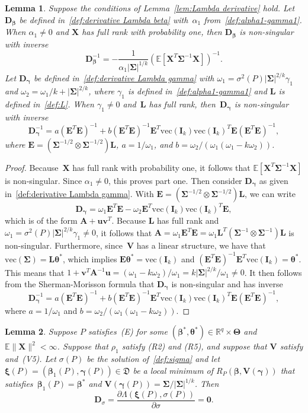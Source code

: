 \documentclass{article}
\numberwithin{equation}{section}
\theoremstyle{plain}
\newtheorem{lemma}{Lemma}
\newcommand{\R}{\mathbb{R}}
\newcommand{\vc}{\mathrm{vec}}
\newcommand{\bbeta}{\bm\beta}
\newcommand{\btheta}{\bm\theta}
\newcommand{\bxi}{\bm\xi}
\newcommand{\bgamma}{\bm\gamma}
\newcommand{\bSigma}{\mathbf{\Sigma}}
\newcommand{\bTheta}{\bm\Theta}
\newcommand{\bu}{\mathbf{u}}
\newcommand{\bv}{\mathbf{v}}
\newcommand{\bX}{\mathbf{X}}
\newcommand{\bV}{\mathbf{V}}
\newcommand{\bI}{\mathbf{I}}
\newcommand{\bA}{\mathbf{A}}
\newcommand{\bD}{\mathbf{D}}
\newcommand{\bL}{\mathbf{L}}
\newcommand{\bE}{\mathbf{E}}
\newcommand{\E}{\mathbb{E}}
\begin{document}
\begin{lemma}
\label{lem:inverse}
Suppose the conditions of Lemma~\ref{lem:Lambda derivative} hold.
Let $\bD_{\bbeta}$ be defined in~\eqref{def:derivative Lambda beta} with~$\alpha_1$ from~\eqref{def:alpha1-gamma1}.
When $\alpha_1\ne0$ and $\bX$ has full rank with probability one,
then $\bD_{\bbeta}$ is non-singular with inverse
\[
\bD_{\bbeta}^{-1}
=
-\frac{1}{\alpha_1|\bSigma|^{1/k}}
\left(
\E\left[
\bX^T\bSigma^{-1}\bX
\right]
\right)^{-1}.
\] 
Let $\bD_{\bgamma}$ be defined in~\eqref{def:derivative Lambda gamma}
with $\omega_1=\sigma^2(P)|\bSigma|^{2/k}\gamma_1$ and $\omega_2=\omega_1/k+|\bSigma|^{2/k}$, 
where $\gamma_1$ is defined in~\eqref{def:alpha1-gamma1} and $\bL$ is defined in~\eqref{def:L}.
When $\gamma_1\ne0$ and~$\bL$ has full rank,
then~$\bD_{\bgamma}$ is non-singular with inverse
\[
\bD_{\bgamma}^{-1}
=
a(\bE^T\bE)^{-1}
+
b
(\bE^T\bE)^{-1}
\bE^T\vc(\bI_k)\vc(\bI_k)^T\bE
(\bE^T\bE)^{-1},
\]
where $\bE=(\bSigma^{-1/2}\otimes\bSigma^{-1/2})\bL$,
$a=1/\omega_1$, and $b=\omega_2/(\omega_1(\omega_1-k\omega_2))$.
\end{lemma}
\begin{proof}
Because~$\bX$ has full rank with probability one, it follows that $\E[\bX^T\bSigma^{-1}\bX]$ is non-singular.
Since $\alpha_1\ne0$, this proves part one.
Then consider $\bD_{\bgamma}$ as given in~\eqref{def:derivative Lambda gamma}.
With $\bE=(\bSigma^{-1/2}\otimes\bSigma^{-1/2})\bL$,
we can write
\[
\bD_{\bgamma}
=
\omega_1\bE^T\bE
-
\omega_2\bE^T\vc(\bI_k)\vc(\bI_k)^T\bE,
\]
which is of the form $\bA+\bu\bv^T$.
Because $\bL$ has full rank and $\omega_1=\sigma^2(P)|\bSigma|^{2/k}\gamma_1\ne0$, it follows that 
$\bA=\omega_1\bE^T\bE=\omega_1\bL^T\left(\bSigma^{-1}\otimes\bSigma^{-1}\right)\bL$ is non-singular.
Furthermore, since~$\bV$ has a linear structure, we have that $\vc(\bSigma)=\bL\btheta^*$,
which implies $\bE\btheta^*=\vc(\bI_k)$ and $(\bE^T\bE)^{-1}\bE^T\vc(\bI_k)=\btheta^*$.
This means that $1+\bv^T\bA^{-1}\bu=(\omega_1-k\omega_2)/\omega_1=k|\bSigma|^{2/k}/\omega_1\ne0$.
It then follows from the Sherman-Morisson formula that $\bD_{\bgamma}$ is non-singular
and has inverse
\[
\bD_{\bgamma}^{-1}
=
a(\bE^T\bE)^{-1}
+
b
(\bE^T\bE)^{-1}
\bE^T\vc(\bI_k)\vc(\bI_k)^T\bE
(\bE^T\bE)^{-1},
\]
where 
$a=1/\omega_1$ and $b=\omega_2/(\omega_1(\omega_1-k\omega_2))$.
\end{proof}

\begin{lemma}
\label{lem:Dsigma=0}
Suppose $P$ satisfies~(E) for some $(\bbeta^*,\btheta^*)\in\R^q\times\bTheta$
and~$\E\|\bX\|^2<\infty$.
Suppose that $\rho_1$ satisfy (R2) and (R5), and suppose that $\bV$ satisfy and~(V5).
Let $\sigma(P)$ be the solution of~\eqref{def:sigma} and let $\bxi(P)=(\bbeta_1(P),\bgamma(P))\in \mathfrak{D}$ be
a local minimum of $R_P(\bbeta,\bV(\bgamma))$ that
satisfies~$\bbeta_1(P)=\bbeta^*$ and $\bV(\bgamma(P))=\bSigma/|\bSigma|^{1/k}$.
Then 
\[
\bD_{\sigma}
=
\frac{\partial\Lambda(\bxi(P),\sigma(P))}{\partial\sigma}=\mathbf{0}.
\]
\end{lemma}
\end{document}
